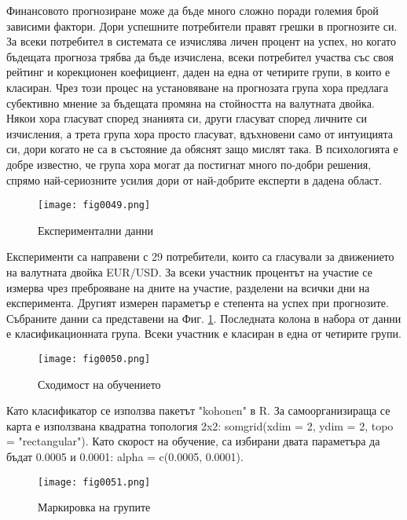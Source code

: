 Финансовото прогнозиране може да бъде много сложно поради големия брой зависими фактори. Дори успешните потребители правят грешки в прогнозите си. За всеки потребител в системата се изчислява личен процент на успех, но когато бъдещата прогноза трябва да бъде изчислена, всеки потребител участва със своя рейтинг и корекционен коефициент, даден на една от четирите групи, в които е класиран. Чрез този процес на установяване на прогнозата група хора предлага субективно мнение за бъдещата промяна на стойността на валутната двойка. Някои хора гласуват според знанията си, други гласуват според личните си изчисления, а трета група хора просто гласуват, вдъхновени само от интуицията си, дори когато не са в състояние да обяснят защо мислят така. В психологията е добре известно, че група хора могат да постигнат много по-добри решения, спрямо най-сериозните усилия дори от най-добрите експерти в дадена област.

\begin{figure}[H]
  \centering
  \texttt{[image: fig0049.png]}
  \caption{Експериментални данни}
\label{fig0049}
\end{figure}

Експерименти са направени с 29 потребители, които са гласували за движението на валутната двойка EUR/USD. За всеки участник процентът на участие се измерва чрез преброяване на дните на участие, разделени на всички дни на експеримента. Другият измерен параметър е степента на успех при прогнозите. Събраните данни са представени на Фиг. \ref{fig0049}. Последната колона в набора от данни е класификационната група. Всеки участник е класиран в една от четирите групи.

\begin{figure}[H]
  \centering
  \texttt{[image: fig0050.png]}
  \caption{Сходимост на обучението}
\label{fig0050}
\end{figure}

Като класификатор се използва пакетът "kohonen" в R. За самоорганизираща се карта е използвана квадратна топология 2x2: somgrid(xdim = 2, ydim = 2, topo = "rectangular"). Като скорост на обучение, са избирани двата параметъра да бъдат 0.0005 и 0.0001: alpha = c(0.0005, 0.0001).

\begin{figure}[H]
  \centering
  \texttt{[image: fig0051.png]}
  \caption{Маркировка на групите}
\label{fig0051}
\end{figure}

